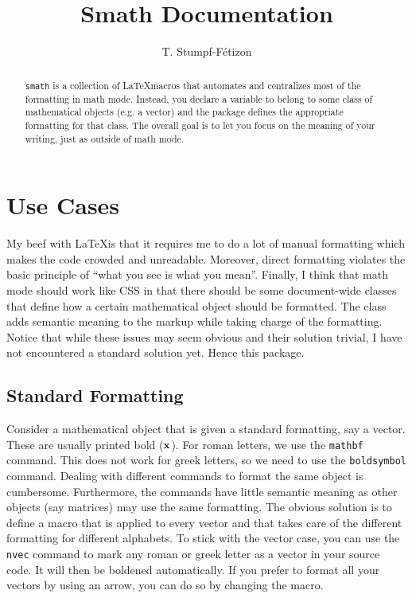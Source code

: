 \documentclass[a4paper,10pt]{scrartcl}
\title{Smath Documentation}
\author{T. Stumpf-Fétizon}
\begin{document}
\maketitle

\begin{abstract}
\texttt{smath} is a collection of \LaTeX macros that automates and centralizes most of the formatting in math mode. Instead, you declare a variable to belong to some class of mathematical objects (e.g. a vector) and the package defines the appropriate formatting for that class. The overall goal is to let you focus on the meaning of your writing, just as outside of math mode.
\end{abstract}

\section{Use Cases}
My beef with \LaTeX is that it requires me to do a lot of manual formatting which makes the code crowded and unreadable. Moreover, direct formatting violates the basic principle of ``what you see is what you mean''. Finally, I think that math mode should work like CSS in that there should be some document-wide classes that define how a certain mathematical object should be formatted. The class adds semantic meaning to the markup while taking charge of the formatting. Notice that while these issues may seem obvious and their solution trivial, I have not encountered a standard solution yet. Hence this package.
\subsection{Standard Formatting}
Consider a mathematical object that is given a standard formatting, say a vector. These are usually printed bold ($\boldsymbol{\mathbf{x}}$). For roman letters, we use the \texttt{mathbf} command. This does not work for greek letters, so we need to use the \texttt{boldsymbol} command. Dealing with different commands to format the same object is cumbersome. Furthermore, the commands have little semantic meaning as other objects (say matrices) may use the same formatting. The obvious solution is to define a macro that is applied to every vector and that takes care of the different formatting for different alphabets. To stick with the vector case, you can use the \texttt{nvec} command to mark any roman or greek letter as a vector in your source code. It will then be boldened automatically. If you prefer to format all your vectors by using an arrow, you can do so by changing the macro.
\end{document}
